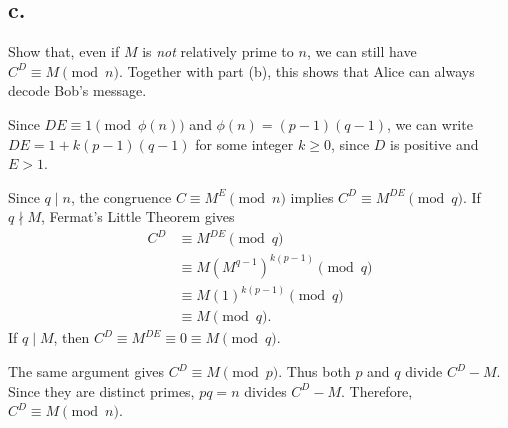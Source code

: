 \documentclass[11pt]{article}
\begin{document}
\begin{problem}[1]
\subsection*{c.}
Show that, even if $M$ is \emph{not} relatively prime to $n$, we can still have $C^D \equiv M \pmod{n}$.
Together with part (b), this shows that Alice can always decode Bob's message.

\begin{solution}
Since $DE \equiv 1 \pmod{\phi(n)}$ and
$\phi(n) = (p-1)(q-1)$, we can write
$DE = 1 + k(p-1)(q-1)$ for some integer $k \geq 0$,
since $D$ is positive and $E > 1$.

Since $q \mid n$, the congruence $C \equiv M^E \pmod{n}$
implies $C^D \equiv M^{DE} \pmod{q}$.
If $q \nmid M$, Fermat's Little Theorem gives
\begin{align*}
    C^D &\equiv M^{DE} \pmod{q}\\
    &\equiv M(M^{q-1})^{k(p-1)} \pmod{q}\\
    &\equiv M(1)^{k(p-1)} \pmod{q}\\
    &\equiv M \pmod{q}.
\end{align*}
If $q \mid M$, then
$C^D \equiv M^{DE} \equiv 0 \equiv M \pmod{q}$.

The same argument gives $C^D \equiv M \pmod{p}$.
Thus both $p$ and $q$ divide $C^D - M$. Since they are
distinct primes, $pq = n$ divides $C^D - M$.
Therefore, $C^D \equiv M \pmod{n}$.
\end{solution}
\end{problem}
\end{document}
